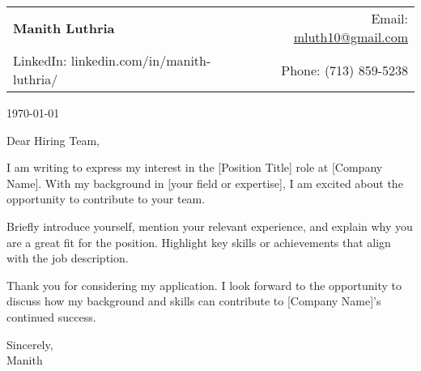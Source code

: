 \documentclass[letterpaper,11pt]{article}
\makeatletter
\newcommand{\contactInfo}[4]{
  \begin{tabular*}{\textwidth}{l@{\extracolsep{\fill}}r}
    \textbf{\Large #1} & Email: \href{mailto:#2}{#2} \\
    #3 & Phone: #4 \\
  \end{tabular*}
}
\makeatother
\begin{document}
\contactInfo{Manith Luthria}{mluth10@gmail.com}{LinkedIn: linkedin.com/in/manith-luthria/}{(713) 859-5238}

\vspace{1em}

\today

\vspace{1em}

\vspace{1em}

Dear Hiring Team,

\vspace{1em}

I am writing to express my interest in the [Position Title] role at [Company Name]. With my background in [your field or expertise], I am excited about the opportunity to contribute to your team.

Briefly introduce yourself, mention your relevant experience, and explain why you are a great fit for the position. Highlight key skills or achievements that align with the job description.


Thank you for considering my application. I look forward to the opportunity to discuss how my background and skills can contribute to [Company Name]'s continued success.

\vspace{1em}

Sincerely,\\
Manith
\end{document}
